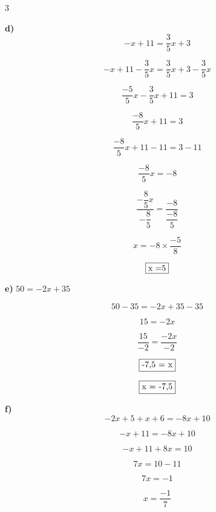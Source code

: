 \documentclass[a4paper,11pt]{article}
\newcommand{\bmul}[1]{\begin{multicols}{#1}}
\newcommand{\emul}{\end{multicols}}
\begin{document}
\bmul{3}




\textbf{d)} $$-x+11 = \dfrac{3}{5} x+3$$

\color{red}
$$ -x+11-\dfrac{3}{5}x = \dfrac{3}{5} x+3 - \dfrac{3}{5}x $$

$$ \dfrac{-5}{5}x -\dfrac{3}{5}x +11  =  3$$

$$ \dfrac{-8}{5}x  +11  =  3$$

$$ \dfrac{-8}{5}x  +11 -11 =  3-11$$

$$ \dfrac{-8}{5}x   =  -8$$

$$ \dfrac{-\dfrac{8}{5}x }{-\dfrac{8}{5}} =  \dfrac{-8}{\dfrac{-8}{5}}$$

$$ x =  -8  \times  \dfrac{-5}{8}$$



$$\fbox{x =5}$$
\color{black}

\columnbreak


\textbf{e)} $50 = -2x + 35$


\color{red}
$$ 50-35= -2x +35 -35$$

$$15  =  -2x$$


$$ \dfrac{15}{-2}  =  \dfrac{-2x}{-2}$$

$$\fbox{-7,5 = x}$$

$$\fbox{x = -7,5}$$

\color{black}



\columnbreak

\textbf{f)} $$-2x+5+x+6=-8x+10 $$

\color{red}

$$-x+11=-8x+10 $$

$$-x+11+8x=10 $$

$$7x=10-11 $$

$$7x=-1 $$

$$x =  \dfrac{-1}{7} $$



\color{black}

\emul
\end{document}

